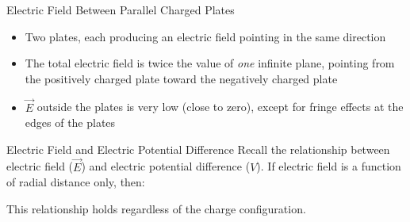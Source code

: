 \documentclass[12pt,aspectratio=169]{beamer}
\begin{document}
\begin{frame}{Electric Field Between Parallel Charged Plates}
  \begin{center}
  \end{center}
  \begin{itemize}
  \item Two plates, each producing an electric field pointing in
    the same direction
  \item The total electric field is twice the value of \emph{one} infinite
    plane, pointing from the positively charged plate toward the negatively
    charged plate

  \item $\vec E$ outside the plates is very low (close to zero), except for
    fringe effects at the edges of the plates
  \end{itemize}
\end{frame}



\begin{frame}{Electric Field and Electric Potential Difference}
  Recall the relationship between electric field ($\vec E$) and electric
  potential difference ($V$). If electric field is a function of radial distance
  only, then:
    
  
  This relationship holds regardless of the charge configuration.
\end{frame}
\end{document}

